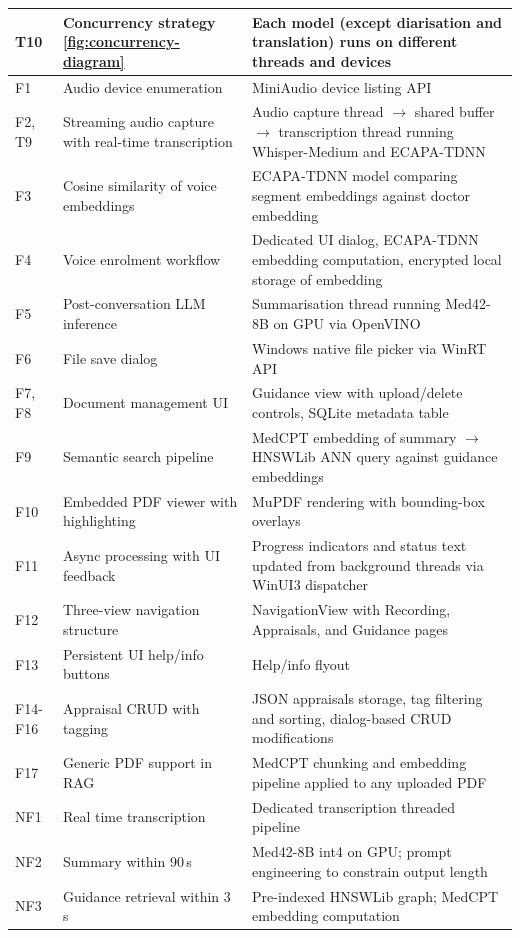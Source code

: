 \begin{longtable}{l p{5.2cm} p{6.8cm}}
T10 & Concurrency strategy \autoref{fig:concurrency-diagram} & Each model (except diarisation and translation) runs on different threads and devices\\
\midrule
F1 & Audio device enumeration & MiniAudio device listing API \\
F2, T9 & Streaming audio capture with real-time transcription & Audio capture thread $\rightarrow$ shared buffer $\rightarrow$ transcription thread running Whisper-Medium and ECAPA-TDNN \\
F3 & Cosine similarity of voice embeddings & ECAPA-TDNN model comparing segment embeddings against doctor embedding \\
F4 & Voice enrolment workflow & Dedicated UI dialog, ECAPA-TDNN embedding computation, encrypted local storage of embedding \\
F5 & Post-conversation LLM inference & Summarisation thread running Med42-8B on GPU via OpenVINO \\
F6 & File save dialog & Windows native file picker via WinRT API \\
F7, F8 & Document management UI & Guidance view with upload/delete controls, SQLite metadata table \\
F9 & Semantic search pipeline & MedCPT embedding of summary $\rightarrow$ HNSWLib ANN query against guidance embeddings \\
F10 & Embedded PDF viewer with highlighting & MuPDF rendering with bounding-box overlays \\
F11 & Async processing with UI feedback & Progress indicators and status text updated from background threads via WinUI3 dispatcher \\
F12 & Three-view navigation structure & NavigationView with Recording, Appraisals, and Guidance pages \\
F13 & Persistent UI help/info buttons & Help/info flyout\\
F14-F16 & Appraisal CRUD with tagging & JSON appraisals storage, tag filtering and sorting, dialog-based CRUD modifications \\
F17 & Generic PDF support in RAG & MedCPT chunking and embedding pipeline applied to any uploaded PDF\\
\midrule
NF1 & Real time transcription & Dedicated transcription threaded pipeline\\
NF2 & Summary within 90\,s & Med42-8B int4 on GPU; prompt engineering to constrain output length \\
NF3 & Guidance retrieval within 3\,s & Pre-indexed HNSWLib graph; MedCPT embedding computation \\

\end{longtable}
